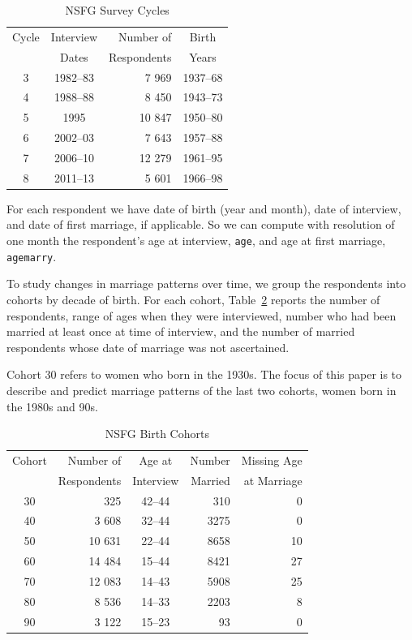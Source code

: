 \documentclass[journal]{IEEEtran}
\begin{document}
\begin{table}[h]
\centering
\begin{tabular}{c|c|r|c}
Cycle & Interview & Number of & Birth \\
       & Dates & Respondents  & Years \\
\hline
3 &  1982--83 & 7 969 & 1937--68 \\
4 &  1988--88 & 8 450 & 1943--73 \\
5 &  1995 & 10 847 & 1950--80 \\
6 &  2002--03 & 7 643 & 1957--88 \\
7 &  2006--10 & 12 279 & 1961--95 \\
8 &  2011--13 & 5 601 & 1966--98 \\
\end{tabular}
\caption{NSFG Survey Cycles}
\label{tab:nsfg}
\end{table}

For each respondent we have date of birth (year and month), date
of interview, and date of first marriage, if applicable.  So we can
compute with resolution of one month the respondent's age at
interview, {\tt age}, and age at first marriage, {\tt agemarry}.

To study changes in marriage patterns over time, we group the
respondents into cohorts by decade of birth.  For each cohort, 
Table~\ref{tab:cohorts} reports the number of respondents, range
of ages when they were interviewed, number who had been married at
least once at time of interview, and the number of married respondents
whose date of marriage was not ascertained.

Cohort 30
refers to women who born in the 1930s.  The focus of this
paper is to describe and predict marriage patterns of the
last two cohorts, women born in the 1980s and 90s.

\begin{table}[ht]
\centering
\begin{tabular}{c|r|c|r|r}
Cohort & Number of    & Age at     & Number  & Missing Age \\
       & Respondents  & Interview  & Married & at Marriage \\
\hline
30 & 325 & 42--44 & 310 & 0 \\
40 & 3 608 & 32--44 & 3275 & 0 \\
50 & 10 631 & 22--44 & 8658 & 10 \\
60 & 14 484 & 15--44 & 8421 & 27 \\
70 & 12 083 & 14--43 & 5908 & 25 \\
80 & 8 536 & 14--33 & 2203 & 8 \\
90 & 3 122 & 15--23 & 93 & 0 \\
\end{tabular}
\caption{NSFG Birth Cohorts}
\label{tab:cohorts}
\end{table}
\end{document}
